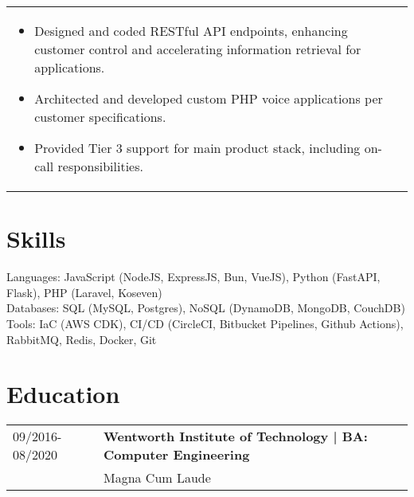 \documentclass[a4paper,10pt]{article}
\begin{document}
\begin{tabularx}{\linewidth}{l|>{\raggedright\arraybackslash}X}
  \begin{itemize}[leftmargin=*]
    \item Designed and coded RESTful API endpoints, enhancing customer control and accelerating information retrieval for applications.
    \item Architected and developed custom PHP voice applications per customer specifications.
    \item Provided Tier 3 support for main product stack, including on-call responsibilities.
  \end{itemize} \\
\end{tabularx}

\section*{\textcolor{blueishgray}{Skills}}
Languages: JavaScript (NodeJS, ExpressJS, Bun, VueJS), Python (FastAPI, Flask), PHP (Laravel, Koseven) \\
Databases: SQL (MySQL, Postgres), NoSQL (DynamoDB, MongoDB, CouchDB) \\
Tools: IaC (AWS CDK), CI/CD (CircleCI, Bitbucket Pipelines, Github Actions), RabbitMQ, Redis, Docker, Git

\section*{\textcolor{blueishgray}{Education}}
\begin{tabularx}{\linewidth}{l|>{\raggedright\arraybackslash}X}
    {\small \textcolor{datecolor}{09/2016-08/2020}} & \textbf{\textcolor{blueishgray}{Wentworth Institute of Technology} | BA: Computer Engineering} \\  & Magna Cum Laude
\end{tabularx}
\end{document}
